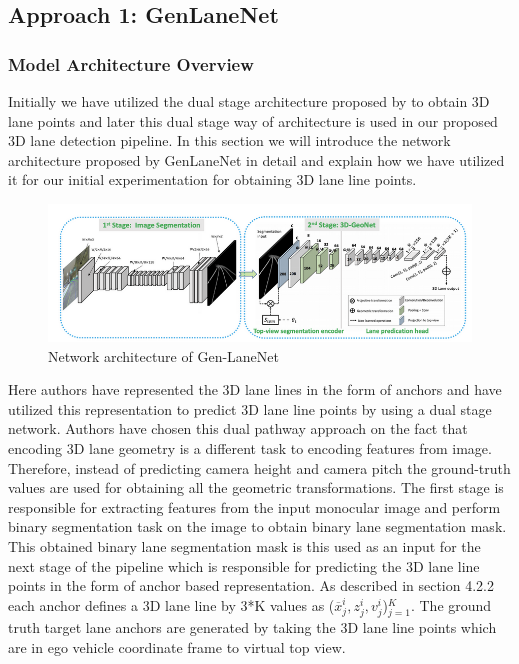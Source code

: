         \subsection{Approach 1: GenLaneNet\cite{guo2020gen}}
        
        \subsubsection{Model Architecture Overview}
        Initially we have utilized the dual stage architecture proposed by \cite{guo2020gen} to obtain 3D lane points and later this dual stage way of architecture is used in our proposed 3D lane detection pipeline. In this section we will introduce the network architecture proposed by GenLaneNet\cite{guo2020gen} in detail and explain how we have utilized it for our initial experimentation for obtaining 3D lane line points.
        
         \begin{figure}[h]
    \centering
    \includegraphics[width=13cm]{images/GenLaneNET.png}
    \caption{Network architecture of Gen-LaneNet \cite{guo2020gen}}
    \end{figure}
         
         Here authors have represented the 3D lane lines in the form of anchors and have utilized this representation to predict 3D lane line points by using a dual stage network. Authors have chosen this dual pathway approach on the fact that encoding 3D lane geometry is a different task to encoding features from image. Therefore, instead of predicting camera height and camera pitch the ground-truth values are used for obtaining all the geometric transformations. 
         The first stage is responsible for extracting features from the input monocular image and perform binary segmentation task on the image to obtain binary lane segmentation mask. This obtained binary lane segmentation mask is this used as an input for the next stage of the pipeline which is responsible for predicting the 3D lane line points in the form of anchor based representation. As described in section 4.2.2 each anchor defines a 3D lane line by 3*K values as ($\overline{x}^{i}_{j},z^{i}_{j},v^{i}_{j}$)$^{K}_{j=1}$. The ground truth target lane anchors are generated by taking the 3D lane line points which are in ego vehicle coordinate frame to virtual top view.
         
